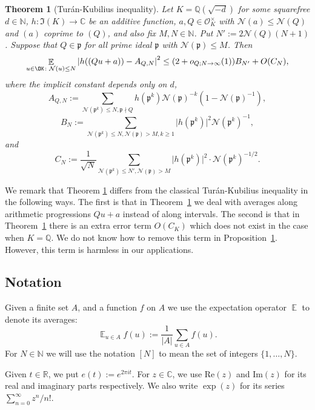 \documentclass[11pt]{amsart}
\newtheorem{theorem}[lemma]{Theorem}
\theoremstyle{definition}
\DeclareMathOperator*{\E}{\mathbb{E}}
\newcommand{\C}{{\mathbb C}}
\newcommand{\N}{{\mathbb N}}
\newcommand{\NN}{{\mathcal N}}
\newcommand{\Q}{{\mathbb Q}}
\newcommand{\R}{{\mathbb R}}
\newcommand{\mf}{\mathfrak}
\newcommand{\WS}[1]{{\color{blue}{{#1}}}}
\begin{document}
\begin{theorem}[Tur\'an-Kubilius inequality]\label{TK}
    Let $K=\Q(\sqrt{-d})$ for some squarefree $d\in\N$, $h\colon\mf I(K)\to\C$ be an additive function, $a,Q\in\mathcal{O}_K^{\times}$ with $\NN(a)\leq \NN(Q)$ and $(a)$ coprime to $(Q)$, and also fix $M,N\in\N$. Put $N':=2\NN(Q)(N+1)$. Suppose that $Q\in \mf p$ for all prime ideal $\mf p$ with $\NN(\mf p)\leq M$.
    Then \begin{equation}\label{ltk}
    \begin{split}
       \E_{u\in\OK\colon\NN(u) \leq N}\left| h((Qu+a))-A_{Q,N}\right|^{2}
       \leq %
       (2+o_{Q;N\to\infty}(1))B_{N'}+O(C_{N}),
    \end{split}
\end{equation}
where the implicit constant depends only on $d$,
$$A_{Q,N}:=\sum_{\NN(\mf p^{k})\leq N,\mf p\nmid Q}h(\mf p^{k})\NN(\mf p)^{-k}(1-\NN(\mf p)^{-1}),$$
$$B_{N}:=\sum_{\NN(\mf p^{k})\leq N, \NN(\mf p)>M, k\geq 1}\vert h(\mf p^{k})\vert^{2}\NN(\mf p^{k})^{-1},$$
and
$$C_{N}:=\frac{1}{\sqrt{N}}\sum_{\NN(\mf p^{k})\leq N', \NN(\mf p)>M}\vert h(\mf p^{k})\vert^{2}\cdot \NN(\mf p^{k})^{-1/2}.$$
\end{theorem}


We remark that Theorem \ref{TK} differs from the classical  Tur\'an-Kubilius inequality in the following ways. The first is that in Theorem~\ref{TK} we deal with averages along arithmetic progressions $Qu+a$ instead of along intervals. The second is that in Theorem~\ref{TK} there is an extra error term $O(C_{K})$ which does not exist in the case when $K=\Q$. We do not know how to remove this term in Proposition~\ref{TK}. However, this term is harmless in our applications.



\subsection{Notation}
Given a finite set $A$, and a function $f$ on $A$ we use the expectation operator $\E$ to denote its averages:
\[
\E_{u \in A} f(u):=\frac{1}{|A|} \sum_{u \in A} f(u).
\]
For $N \in \N$ we will use the notation $[N]$ to mean the set of integers $\{1,\dots,N\}$.

Given $t \in \R$, we put $e(t):=e^{2\pi i t}$.
For $z \in \C$,
we use $\text{Re}(z)$ and $\text{Im}(z)$ for its real and imaginary parts respectively.   We also write $\exp(z)$ for its series $\sum_{n=0}^{\infty} z^n/n!$.  
\end{document}
